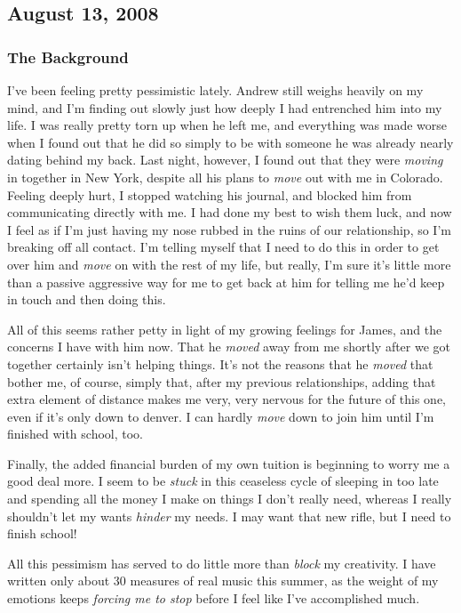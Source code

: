 \subsection{August 13, 2008}
\subsubsection*{The Background}
I've been feeling pretty pessimistic lately.  Andrew still weighs
heavily on my mind, and I'm finding out slowly just how deeply I had
entrenched him into my life.  I was really pretty torn up when he left
me, and everything was made worse when I found out that he did so simply
to be with someone he was already nearly dating behind my back.  Last
night, however, I found out that they were \emph{moving} in together in New
York, despite all his plans to \emph{move} out with me in Colorado.  Feeling
deeply hurt, I stopped watching his journal, and blocked him from
communicating directly with me.  I had done my best to wish them luck, and
now I feel as if I'm just having my nose rubbed in the ruins of our
relationship, so I'm breaking off all contact.  I'm telling myself that
I need to do this in order to get over him and \emph{move} on with the rest of my
life, but really, I'm sure it's little more than a passive aggressive
way for me to get back at him for telling me he'd keep in touch and then
doing this.

All of this seems rather petty in light of my growing feelings for
James, and the concerns I have with him now.  That he \emph{moved}
away from me shortly after we got together certainly isn't helping
things.  It's not the reasons that he \emph{moved} that bother me, of
course, simply that, after my previous relationships, adding that extra
element of distance makes me very, very nervous for the future of this
one, even if it's only down to denver.  I can hardly \emph{move} down 
to join him until I'm finished with school, too.

Finally, the added financial burden of my own tuition is beginning to
worry me a good deal more.  I seem to be \emph{stuck} in this
ceaseless cycle of sleeping in too late and spending all the money I
make on things I don't really need, whereas I really shouldn't let my
wants \emph{hinder} my needs.  I may want that new rifle, but I need
to finish school!

All this pessimism has served to do little more than \emph{block} my
creativity.  I have written only about 30 measures of real music this
summer, as the weight of my emotions keeps \emph{forcing me to stop}
before I feel like I've accomplished much.

